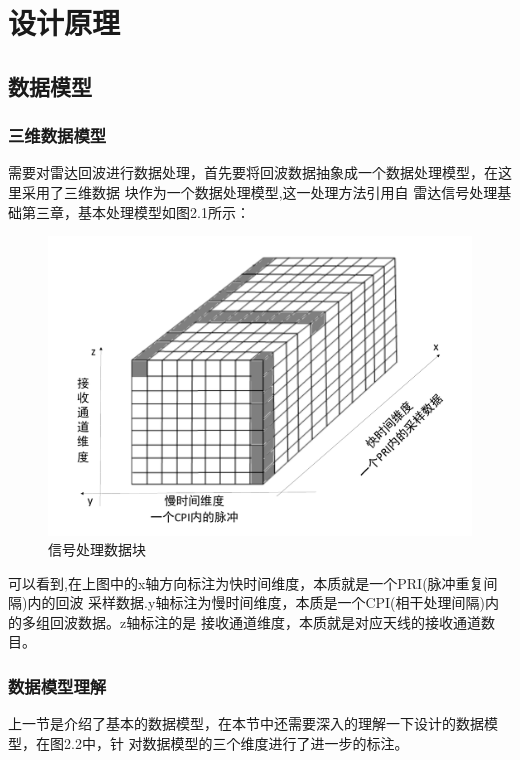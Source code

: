 \documentclass[a4paper,12pt]{report}
\begin{document}
\chapter{设计原理}
\begin{spacing}{1.5}
\songti{}

\section{数据模型}
\subsection{三维数据模型}
需要对雷达回波进行数据处理，首先要将回波数据抽象成一个数据处理模型，在这里采用了三维数据
块作为一个数据处理模型\cite{FundamentalsOfRadarSignalProcessing},这一处理方法引用自
雷达信号处理基础第三章，基本处理模型如图2.1所示：
\begin{figure}[hbtp]
    \centering
    \includegraphics [width=1.0\textwidth]{figure//DataBlock.pdf}
    \caption{信号处理数据块}\label{DataBlock}
\end{figure}

可以看到,在上图中的x轴方向标注为快时间维度，本质就是一个PRI(脉冲重复间隔)内的回波
采样数据.y轴标注为慢时间维度，本质是一个CPI(相干处理间隔)内的多组回波数据。z轴标注的是
接收通道维度，本质就是对应天线的接收通道数目。

\subsection{数据模型理解}
上一节是介绍了基本的数据模型，在本节中还需要深入的理解一下设计的数据模型，在图2.2中，针
对数据模型的三个维度进行了进一步的标注。



\end{spacing}
\end{document}
